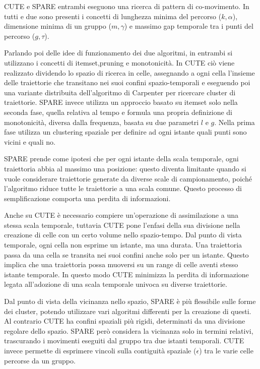 CUTE e SPARE entrambi eseguono una ricerca di pattern di co-movimento.
In tutti e due sono presenti i concetti di lunghezza minima del percorso (\(k, \alpha\)), dimensione minima di un gruppo (\(m, \gamma\)) e massimo gap temporale tra i punti del percorso (\(g, \tau\)).

Parlando poi delle idee di funzionamento dei due algoritmi, in entrambi si utilizzano i concetti di itemset,pruning e monotonicità. 
In CUTE ciò viene realizzato dividendo lo spazio di ricerca in celle, assegnando a ogni cella l'insieme delle traiettorie che transitano nei suoi confini spazio-temporali e eseguendo poi una variante distribuita dell'algoritmo di Carpenter per ricercare cluster di traiettorie.
SPARE invece utilizza un approccio basato su itemset solo nella seconda fase, quella relativa al tempo e formula una propria definizione di monotonicità, diversa dalla frequenza, basata su due parametri \(l\) e \(g\).
Nella prima fase utilizza un clustering spaziale per definire ad ogni istante quali punti sono vicini e quali no.

SPARE prende come ipotesi che per ogni istante della scala temporale, ogni traiettoria abbia al massimo una posizione: questo diventa limitante quando si vuole considerare traiettorie generate da diverse scale di campionamento, poiché l'algoritmo riduce tutte le traiettorie a una scala comune.
Questo processo di semplificazione comporta una perdita di informazioni.

Anche su CUTE è necessario compiere un'operazione di assimilazione a una stessa scala temporale, tuttavia CUTE pone l'enfasi della sua divisione nella creazione di celle con un certo volume nello spazio-tempo.
Dal punto di vista temporale, ogni cella non esprime un istante, ma una durata.
Una traiettoria passa da una cella se transita nei suoi confini anche solo per un istante.
Questo implica che una traiettoria possa muoversi su un range di celle aventi stesso istante temporale.
In questo modo CUTE minimizza la perdita di informazione legata all'adozione di una scala temporale univoca su diverse traiettorie.

Dal punto di vista della vicinanza nello spazio, SPARE è più flessibile sulle forme dei cluster, potendo utilizzare vari algoritmi differenti per la creazione di questi.
Al contrario CUTE ha confini spaziali più rigidi, determinati da una divisione regolare dello spazio.
SPARE però considera la vicinanza solo in termini relativi, trascurando i movimenti eseguiti dal gruppo tra due istanti temporali.
CUTE invece permette di esprimere vincoli sulla contiguità spaziale (\(\epsilon\)) tra le varie celle percorse da un gruppo.

